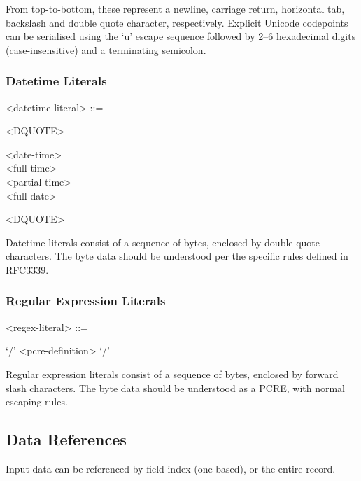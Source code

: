 From top-to-bottom, these represent a newline, carriage return,
horizontal tab, backslash and double quote character, respectively.
Explicit Unicode codepoints can be serialised using the `u' escape
sequence followed by 2--6 hexadecimal digits (case-insensitive) and a
terminating semicolon.

\subsubsection{Datetime Literals}

\begin{grammar}
  <datetime-literal> ::= \begin{syntdiag}
    <DQUOTE>
    \begin{stack}
      <date-time> \\
      <full-time> \\
      <partial-time> \\
      <full-date>
    \end{stack}
    <DQUOTE>
  \end{syntdiag}
\end{grammar}

Datetime literals consist of a sequence of bytes, enclosed by double
quote characters. The byte data should be understood per the specific
rules defined in RFC3339\cite{RFC3339}.

\subsubsection{Regular Expression Literals}

\begin{grammar}
  <regex-literal> ::= \begin{syntdiag}
    `/'
    <pcre-definition>
    `/'
  \end{syntdiag}
\end{grammar}

Regular expression literals consist of a sequence of bytes, enclosed by
forward slash characters. The byte data should be understood as a PCRE,
with normal escaping rules.

\subsection{Data References}

Input data can be referenced by field index (one-based), or the entire
record.

